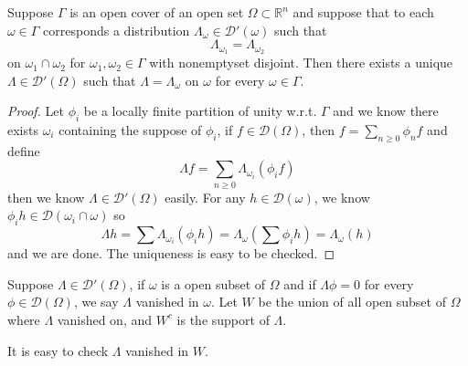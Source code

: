 \documentclass[lang=en, color=blue, ]{elegantbook}
\newcommand{\R}{\mathbb{R}}
\newcommand{\D}{\mathscr{D}}
\begin{document}
\begin{theorem}
    Suppose $\Gamma$ is an open cover of an open set $\Omega \subset \R^n$ and suppose that to each $\omega \in \Gamma$ corresponds a distribution $\Lambda_{\omega} \in \D'(\omega)$ such that
    \[
    \Lambda_{\omega_1} = \Lambda_{\omega_2}
    \]
    on $\omega_1\cap\omega_2$ for $\omega_1,\omega_2\in \Gamma$ with nonemptyset disjoint. Then there exists a unique $\Lambda \in \D'(\Omega)$ such that $\Lambda = \Lambda_{\omega}$ on $\omega$ for every $\omega \in \Gamma$.
\end{theorem}
\begin{proof}
    Let $\phi_i$ be a locally finite partition of unity w.r.t. $\Gamma$ and we know there exists $\omega_i$ containing the suppose of $\phi_i$, if $f \in \D(\Omega)$, then $f = \sum\limits_{n\geq 0}\phi_n f$ and define
    \[
    \Lambda f = \sum_{n\geq 0}\Lambda_{\omega_i}(\phi_i f)
    \]
    then we know $\Lambda \in \D'(\Omega)$ easily. For any $h \in \D(\omega)$, we know $\phi_ih\in\D(\omega_i\cap \omega)$ so
    \[
    \Lambda h = \sum\Lambda_{\omega_i}(\phi_ih) = \Lambda_{\omega}(\sum \phi_i h) = \Lambda_{\omega}(h)
    \]
    and we are done. The uniqueness is easy to be checked.
\end{proof}

\begin{definition}
    Suppose $\Lambda \in \D'(\Omega)$, if $\omega$ is a open subset of $\Omega$ and if $\Lambda \phi = 0$ for every $\phi \in \D(\Omega)$, we say $\Lambda$ vanished in $\omega$. Let $W$ be the union of all open subset of $\Omega$ where $\Lambda$ vanished on, and $W^c$ is the support of $\Lambda$.\par
    It is easy to check $\Lambda$ vanished in $W$.
\end{definition}
\end{document}

